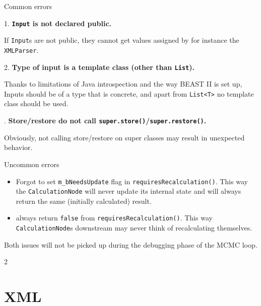 \documentclass{beamer}
\def\part{1}
\theoremstyle{definition}
\begin{document}
\begin{frame}{Common errors}

1. {\bf\color{red} {\tt Input} is not declared public.}

If {\tt Input}s are not public, they cannot get values assigned by for
instance the {\tt XMLParser}.\vskip1cm

\pause

2. {\bf\color{red} Type of input is a template class (other than {\tt List}).}

Thanks to limitations of Java introspection and the way BEAST II is set up, Inputs should be 
of a type that is concrete, and apart from {\tt List<T>} no template class should be used.\vskip1cm

. {\bf\color{red} Store/restore do not call {\tt super.store()}/{\tt super.restore()}.}

Obviously, not calling store/restore on super classes may result in unexpected behavior.

\end{frame}


\begin{frame}{Uncommon errors}
\begin{itemize}
\item Forgot to set {\tt m\_bNeedsUpdate} flag in {\tt requiresRecalculation()}. This way
the {\tt CalculationNode} will never update its internal state and will always return the
same (initially calculated) result.
\item always return {\tt false} from {\tt requiresRecalculation()}. This way {\tt CalculationNode}s 
downstream may never think of recalculating themselves.
\end{itemize}
Both issues will not be picked up during the debugging phase
of the MCMC loop.

\end{frame}


\fi
\if \part 2




\section{XML}
\end{document}
